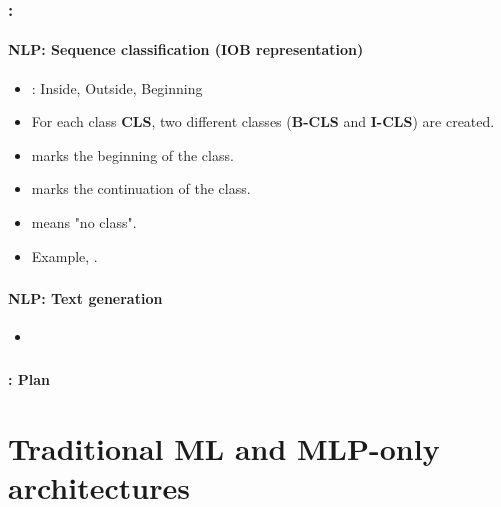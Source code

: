 \documentclass[xcolor=table]{beamer}
\begin{document}
\begin{frame}
	\frametitle{\insertshortsubtitle: \insertsection}
	\framesubtitle{NLP: Sequence classification (IOB representation)}
	
	\begin{itemize}
		\item {}: Inside, Outside, Beginning
		\item For each class \textbf{CLS}, two different classes (\textbf{B-CLS} and \textbf{I-CLS}) are created.
		\item {} marks the beginning of the class.
		\item {} marks the continuation of the class.
		\item {} means "no class".
		\item Example, .
	\end{itemize}
\end{frame}


\begin{frame}
	\frametitle{\inserttitle}
	\framesubtitle{NLP: Text generation}
	
	\begin{itemize}
		\item 
	\end{itemize}
	
\end{frame}


\begin{frame}
	\frametitle{\inserttitle}
	\framesubtitle{\insertshortsubtitle: Plan}
	
	\begin{multicols}{2}
		\small
		\tableofcontents
	\end{multicols}
\end{frame}



\section{Traditional ML and MLP-only architectures}
\end{document}
